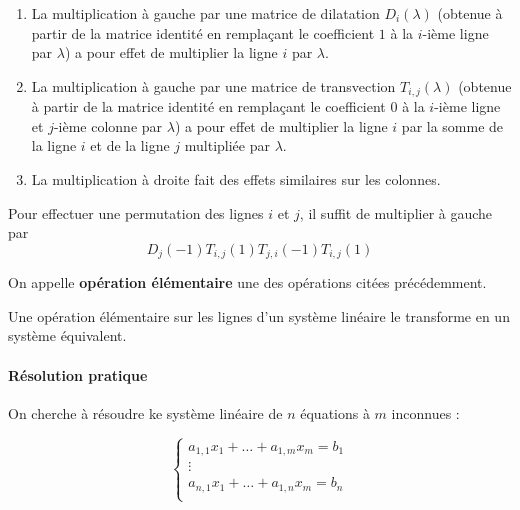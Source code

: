   \begin{theorem}
    \begin{enumerate}[label=(\roman*)]
      \item La multiplication à gauche par une matrice de dilatation $D_i(\lambda)$ (obtenue à partir de la matrice identité en remplaçant le coefficient $1$ à la $i$-ième ligne par $\lambda$) a pour effet de multiplier la ligne $i$ par $\lambda$.
      \item La multiplication à gauche par une matrice de transvection $T_{i,j}(\lambda)$ (obtenue à partir de la matrice identité en remplaçant le coefficient $0$ à la $i$-ième ligne et $j$-ième colonne par $\lambda$) a pour effet de multiplier la ligne $i$ par la somme de la ligne $i$ et de la ligne $j$ multipliée par $\lambda$.
      \item La multiplication à droite fait des effets similaires sur les colonnes.
    \end{enumerate}
  \end{theorem}
  
  \begin{remark}
    Pour effectuer une permutation des lignes $i$ et $j$, il suffit de multiplier à gauche par
    \[ D_j(-1)T_{i,j}(1)T_{j,i}(-1)T_{i,j}(1) \]
  \end{remark}
  
  \begin{definition}
    On appelle \textbf{opération élémentaire} une des opérations citées précédemment.
  \end{definition}
  
  \begin{theorem}
    Une opération élémentaire sur les lignes d'un système linéaire le transforme en un système équivalent.
  \end{theorem}
  
  \paragraph{Résolution pratique}
  
  On cherche à résoudre  ke système linéaire de $n$ équations à $m$ inconnues :
  
  \[
  \begin{cases}
    a_{1,1} x_1 + \dots + a_{1,m} x_m = b_1 \\
    \vdots \\
    a_{n,1} x_1 + \dots + a_{1,n} x_m = b_n \\
  \end{cases}
  \tag{$S$}
  \]
  

